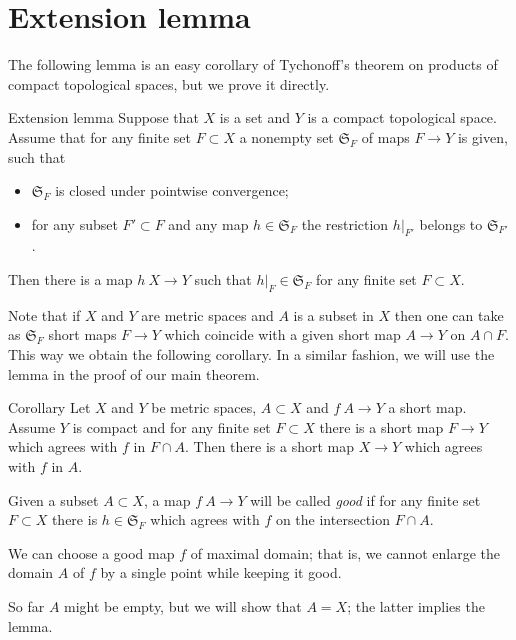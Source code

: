 \section{Extension lemma}\label{Finite-whole extension lemma}

The following lemma is an easy corollary of Tychonoff's theorem on products of compact topological spaces, but we prove it directly.

\begin{thm}{Extension lemma}\label{lem:finite-whole}
Suppose that $X$ is a set 
and $Y$ is a compact topological space.
Assume that for any finite set $F\subset X$ 
a nonempty set $\mathfrak{S}_F$ of maps  $F\to Y$ is given, such that
\begin{itemize}
\item $\mathfrak{S}_F$ is closed under pointwise convergence;
\item for any subset $F'\subset F$ and any map $h\in \mathfrak{S}_F$
the restriction $h|_{F'}$ belongs to $\mathfrak{S}_{F'}$. 
\end{itemize}

Then there is a map $h\: X\to Y$ such that $h|_F\in \mathfrak{S}_F$ for any finite set $F\subset X$.
\end{thm}

Note that if $X$ and $Y$ are metric spaces and $A$ is a subset in $X$
then one can take as $\mathfrak{S}_F$ short maps $F\to Y$ which coincide with a given short map $A\to Y$ on $A\cap F$.
This way we obtain the following corollary.
In a similar fashion, we will use the lemma in the proof of our main theorem.

\begin{thm}{Corollary}
Let $X$ and $Y$ be metric spaces, $A\subset X$ and $f\:A\to Y$ a short map.
Assume $Y$ is compact and for any finite set $F\subset X$ there is a short map $F\to Y$ which agrees with $f$ in $F\cap A$.
Then there is a short map $X\to Y$ which agrees with $f$ in $A$.
\end{thm}

Given a subset $A\subset X$,
a map $f\: A\to Y$ will be called \emph{good}
if for any finite set $F\subset X$
there is $h\in\mathfrak{S}_F$ which agrees with $f$ on the intersection $F\cap A$.

We can choose a good map $f$ of maximal domain;
that is, we cannot enlarge the domain $A$ of $f$ by a single point while keeping it good.

So far $A$ might be empty, but we will show that $A=X$;
the latter implies the lemma.

